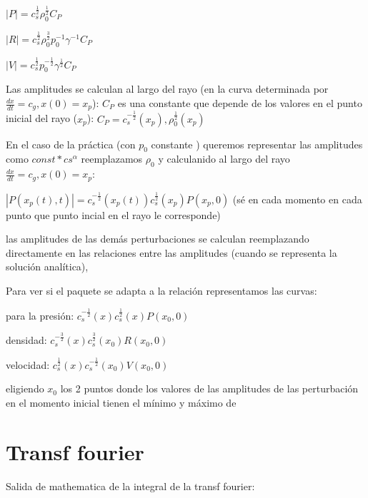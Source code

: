 \documentclass{article}
\begin{document}
\begin{description}
\item $|P| = c_s^{\frac{1}{2}} \rho_0^{\frac{1}{2}}  C_{P}$
\item $|R| = c_s^{\frac{1}{2}} \rho_0^{\frac{3}{2}} p_0^{-1} \gamma^{-1} C_{P}$
\item $|V| = c_s^{\frac{1}{2}}  p_0^{-\frac{1}{2}} \gamma^{\frac{1}{2}} C_{P}$

\item Las amplitudes se calculan al largo del rayo (en la curva determinada por $\frac{dx}{dt} = c_g, x(0) = x_p$): $C_P$ es una constante que depende de los valores en el punto inicial del rayo ($x_p$): $C_P = c_s^{-\frac{1}{2}}(x_p) , \rho_0^{\frac{1}{2}}(x_p)$

\item En el caso de la práctica (con $p_0$ constante ) queremos representar las amplitudes como $const * cs^{\alpha} $ reemplazamos $\rho_0$
y calculanido al largo del rayo  $\frac{dx}{dt} = c_g, x(0) = x_p$:
\item $|P(x_p(t),t)| = c_s^{-\frac{1}{2}}(x_p(t)) c_s^{\frac{1}{2}}(x_p) P(x_p,0)  $ (sé en cada momento en cada punto que punto incial en el rayo le corresponde)
\item las amplitudes de las demás perturbaciones se calculan reemplazando directamente en las relaciones entre las amplitudes (cuando se representa la solución analítica), 
\item Para ver si el paquete se adapta a la relación representamos las curvas:
\item para la presión: $ c_s^{-\frac{1}{2}}(x) c_s^{\frac{1}{2}}(x) P(x_0,0) $
\item densidad: $ c_s^{-\frac{3}{2}}(x) c_s^{\frac{3}{2}}(x_0) R(x_0,0)  $ 
\item velocidad: $ c_s^{\frac{1}{2}}(x) c_s^{-\frac{1}{2}}(x_0) V(x_0,0)  $ 
\item eligiendo $x_0$ los 2 puntos donde  los valores de las amplitudes de las perturbación en el momento inicial tienen el mínimo y máximo de 


\end{description}



\section{Transf fourier}

Salida de mathematica de la integral de la transf fourier:

\end{document}
